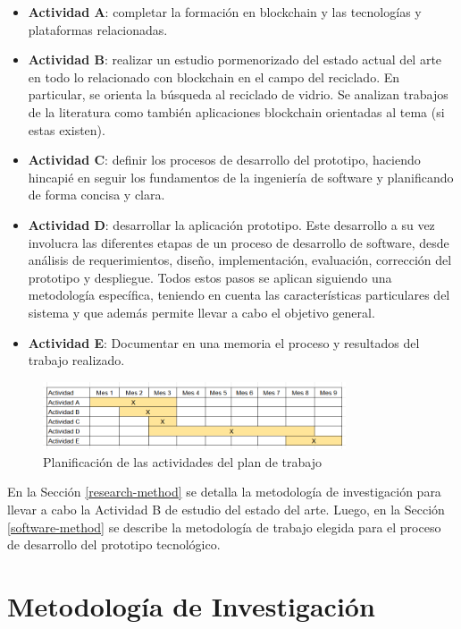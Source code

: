 \begin{itemize}
	\item \textbf{Actividad A}: completar la formación en blockchain y las tecnologías y plataformas relacionadas.
	\item \textbf{Actividad B}: realizar un estudio pormenorizado del estado actual del arte en todo lo relacionado con blockchain en el campo del reciclado. En particular, se orienta la búsqueda al reciclado de vidrio. Se analizan trabajos de la literatura como también aplicaciones blockchain orientadas al tema (si estas existen).
	\item \textbf{Actividad C}: definir los procesos de desarrollo del prototipo, haciendo hincapié en seguir los fundamentos de la ingeniería de software y planificando de forma concisa y clara.
	\item \textbf{Actividad D}: desarrollar la aplicación prototipo. Este desarrollo a su vez involucra las diferentes etapas de un proceso de desarrollo de software, desde análisis de requerimientos, diseño, implementación, evaluación, corrección del prototipo y despliegue. Todos estos pasos se aplican siguiendo una metodología específica, teniendo en cuenta las características particulares del sistema y que además permite llevar a cabo el objetivo general.
	\item \textbf{Actividad E}: Documentar en una memoria el proceso y resultados del trabajo realizado.
\end{itemize}

\begin{figure}[!htpb]
    \centering
    \includegraphics[width=0.8\textwidth]{Figures/activities-plan.png}
    \caption{Planificación de las actividades del plan de trabajo}
    \label{fig:activities-plan}
\end{figure}

En la Sección \ref{research-method} se detalla la metodología de investigación para llevar a cabo la Actividad B de estudio del estado del arte. Luego, en la Sección \ref{software-method} se describe la metodología de trabajo elegida para el proceso de desarrollo del prototipo tecnológico.

\section{Metodología de Investigación}
\label{sec:research-method}


